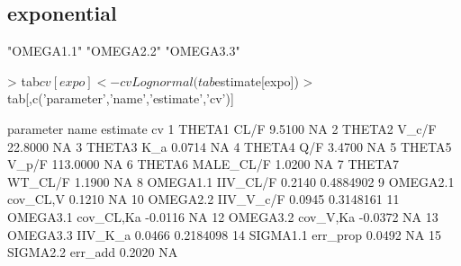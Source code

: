 \subsection{exponential}
\begin{Schunk}
\begin{Soutput}
[1] "OMEGA1.1" "OMEGA2.2" "OMEGA3.3"
\end{Soutput}
\begin{Sinput}
> tab$cv[expo] <- cvLognormal(tab$estimate[expo])
> tab[,c('parameter','name','estimate','cv')]
\end{Sinput}
\begin{Soutput}
   parameter      name estimate        cv
1     THETA1      CL/F   9.5100        NA
2     THETA2     V_c/F  22.8000        NA
3     THETA3       K_a   0.0714        NA
4     THETA4       Q/F   3.4700        NA
5     THETA5     V_p/F 113.0000        NA
6     THETA6 MALE_CL/F   1.0200        NA
7     THETA7   WT_CL/F   1.1900        NA
8   OMEGA1.1  IIV_CL/F   0.2140 0.4884902
9   OMEGA2.1  cov_CL,V   0.1210        NA
10  OMEGA2.2 IIV_V_c/F   0.0945 0.3148161
11  OMEGA3.1 cov_CL,Ka  -0.0116        NA
12  OMEGA3.2  cov_V,Ka  -0.0372        NA
13  OMEGA3.3   IIV_K_a   0.0466 0.2184098
14  SIGMA1.1  err_prop   0.0492        NA
15  SIGMA2.2   err_add   0.2020        NA
\end{Soutput}
\end{Schunk}

